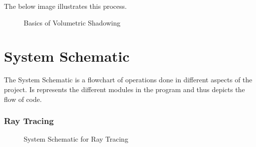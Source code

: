 \documentclass[paper=a4, fontsize=11pt]{scrartcl}
\numberwithin{equation}{section}		%
\numberwithin{figure}{section}			%
\numberwithin{table}{section}				%
\begin{document}
The below image illustrates this process.
\vspace{20pt}
\begin{figure}[h]
\centering
{}
\caption{Basics of Volumetric Shadowing}
\end{figure}
\newpage
\section{System Schematic}
The System Schematic is a flowchart of operations done in different aspects of the project. Is represents the different modules in the program and thus depicts the flow of code.

\subsubsection{Ray Tracing}
\vspace{20pt}
\begin{figure}[h]
\centering
{}
\caption{System Schematic for Ray Tracing}
\end{figure}
\newpage
\end{document}

